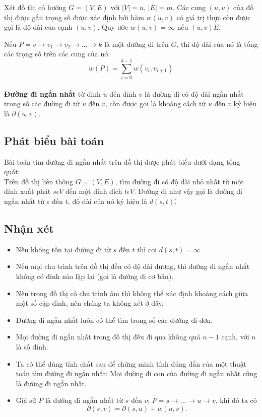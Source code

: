 \documentclass[a4paper,12pt]{report}
\begin{document}
	Xét đồ thị có hướng $ G= (V, E) $ với $ |V|=n $, $ |E|=m $. Các cung $ (u, v) $ của đồ thị được gắn trọng số được xác định bởi hàm $ w(u, v) $ có giá trị thực còn được gọi là độ dài của cạnh $ (u, v) $. Quy ước $ w(u, v) = \infty $ nếu $ (u, v)  E $.


	Nếu $ P = v \rightarrow v_{1} \rightarrow v_{2} \rightarrow \ldots \rightarrow k $ là một đường đi trên $G$, thì độ dài của nó là tổng các trọng số trên các cung của nó: \\
$$ w(P) = \sum \limits_{i=0}^{k-1}{\displaystyle{w(v_{i}, v_{i+1})}} $$ \\


	\textbf{Đường đi ngắn nhất} từ đỉnh $u$ đến đỉnh $v$ là đường đi có độ dài ngắn nhất trong số các đường đi từ $u$ đến $v$, còn được gọi là khoảng cách từ $u$ đến $v$ ký hiệu là $ \partial(u, v) $.



\subsection{Phát biểu bài toán}
	Bài toán tìm đường đi ngắn nhất trên đồ thị được phát biểu dưới dạng tổng quát: \\
	\" Trên đồ thị liên thông $G = (V, E)$, tìm đường đi có độ dài nhỏ nhất từ một đỉnh xuất phát $s \epsilon V$ đến  một đỉnh đích $t \epsilon V$. Đường đi như vậy gọi là đường đi ngắn nhất từ s đến t, độ dài của nó ký hiệu là $d(s, t)$.\"

\subsection{Nhận xét}
\begin{itemize}
 	\item Nếu không tồn tại đường đi từ $s$ đến $t$ thì coi $ d(s, t) = \infty $
	\item Nếu mọi chu trình trên đồ thị đều có độ dài dương, thì đường đi ngắn nhất không có đỉnh nào lặp lại (gọi là đường đi cơ bản).
	\item Nếu trong đồ thị có chu trình âm thì không thể xác định khoảng cách giữa một số cặp đỉnh, nên chúng ta không xét ở đây.
	\item Đường đi ngắn nhất luôn có thể tìm trong số các đường đi đơn.
	\item Mọi đường đi ngắn nhất trong đồ thị đều đi qua không quá $n-1$ cạnh, với $n$ là số đỉnh.
	\item Ta có thể dùng tính chất sau để chứng minh tính đúng đắn của một thuật toán tìm đường đi ngắn nhất: Mọi đường đi con của đường đi ngắn nhất cũng là đường đi ngắn nhất.
	\item Giả sử $P$ là đường đi ngắn nhất từ $s$ đến $v$: $ P = s \rightarrow \ldots \rightarrow u \rightarrow v $,   khi đó ta có                   
	$$\partial(s, v) = \partial(s, u)  + w(u, v).$$

\end{itemize}
\end{document}
